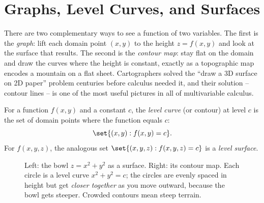 \section{Graphs, Level Curves, and Surfaces}
\label{ch32:sec-graphs}

There are two complementary ways to see a function of two variables. The first is the
\emph{graph}: lift each domain point $(x,y)$ to the height $z=f(x,y)$ and look at the surface
that results. The second is the \emph{contour map}: stay flat on the domain and draw the
curves where the height is constant, exactly as a topographic map encodes a mountain on a flat
sheet. Cartographers solved the ``draw a 3D surface on 2D paper'' problem centuries before
calculus needed it, and their solution -- contour lines -- is one of the most useful pictures
in all of multivariable calculus.

\begin{definition}
\label{ch32:def-level}
For a function $f(x,y)$ and a constant $c$, the \emph{level curve} (or contour) at level $c$
is the set of domain points where the function equals $c$:
\[
   \set{ (x,y) : f(x,y) = c }.
\]
For $f(x,y,z)$, the analogous set $\set{(x,y,z): f(x,y,z)=c}$ is a \emph{level surface}.
\end{definition}

\begin{figure}[H]
\centering
{}
\hspace{0.3cm}
\caption{Left: the bowl $z=x^2+y^2$ as a surface. Right: its contour map. Each circle is a
level curve $x^2+y^2=c$; the circles are evenly spaced in height but get \emph{closer together}
as you move outward, because the bowl gets steeper. Crowded contours mean steep terrain.}
\label{ch32:fig-paraboloid}
\end{figure}

